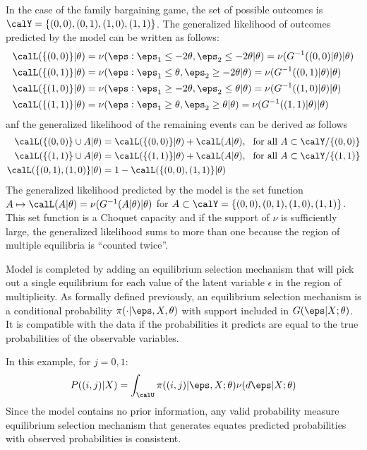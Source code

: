In the case of the family bargaining game, the set of possible outcomes is $\calY = \{(0,0),(0,1),(1,0),(1,1)\}$. The generalized likelihood of outcomes predicted by the model can be written as follows:
\begin{align*}
 	\calL(\{(0,0)\}|\theta) &= \nu(\eps: \eps_1 \leq -2\theta, \eps_2 \leq -2\theta| \theta) = \nu(G^{-1}((0,0)|\theta)|\theta)\\
 	\calL(\{(0,1)\}|\theta) &= \nu(\eps: \eps_1 \leq \theta, \eps_2 \geq -2\theta| \theta) = \nu(G^{-1}((0,1)|\theta)|\theta)\\
 	\calL(\{(1,0)\}|\theta) &= \nu(\eps: \eps_1 \geq -2\theta, \eps_2 \leq \theta| \theta) = \nu(G^{-1}((1,0)|\theta)|\theta)\\
 	\calL(\{(1,1)\}|\theta) &= \nu(\eps: \eps_1 \geq \theta, \eps_2 \geq \theta| \theta) = \nu(G^{-1}((1,1)|\theta)|\theta)
\end{align*}
anf the generalized likelihood of the remaining events can be derived as follows
\begin{align*}
	\calL(\{(0,0)\}\cup A | \theta) &= \calL(\{(0,0)\}|\theta) + \calL(A|\theta),\hbox{ }\text{ for all }A \subset \calY/\{(0,0)\}\\
	\calL(\{(1,1)\}\cup A | \theta) &= \calL(\{(1,1)\}|\theta) + \calL(A|\theta),\hbox{ }\text{ for all }A \subset \calY/\{(1,1)\} \\
	\calL(\{(0,1),(1,0)\}|\theta) &= 1 - \calL(\{(0,0),(1,1)\}|\theta)
\end{align*}
The generalized likelihood predicted by the model is the set function $A\mapsto \calL(A|\theta) = \nu(G^{-1}(A|\theta)|\theta)$ for $A \subset \calY = \{(0,0),(0,1),(1,0),(1,1)\}$. This set function is a Choquet capacity and if the support of $\nu$ is sufficiently large, the generalized likelihood sums to more than one because the region of multiple equilibria is ``counted twice''.

Model is completed by adding an equilibrium selection mechanism that will pick out a single equilibrium for each value of the latent variable $\epsilon$ in the region of multiplicity. As formally defined previously, an equilibrium selection mechanism is a conditional probability $\pi(\cdot | \eps, X,\theta)$ with support included in $G(\eps|X;\theta)$. It is compatible with the data if the probabilities it predicts are equal to the true probabilities of the observable variables.

In this example, for $j = 0,1$:
\[P((i,j)|X) = \int_\calU \pi((i,j)|\eps, X;\theta)\nu(d\eps|X;\theta)\]
Since the model contains no prior information, any valid probability measure equilibrium selection mechanism that generates equates predicted probabilities with observed probabilities is consistent.

